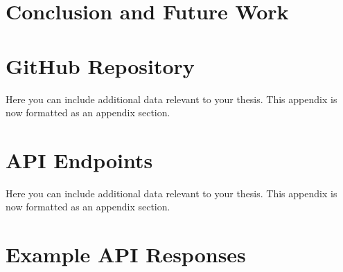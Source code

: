 \documentclass{utitcphd_overleaf}
\begin{document}
\chapter{Conclusion and Future Work}
\label{chap:conclusion}

\appendix
\chapter{GitHub Repository}
\label{app:additionaldata}

Here you can include additional data relevant to your thesis. This appendix is now formatted as an appendix section.

\chapter{API Endpoints}
\label{app:additionaldata}

Here you can include additional data relevant to your thesis. This appendix is now formatted as an appendix section.

\chapter{Example API Responses}
\label{app:additionaldata}
\end{document}
